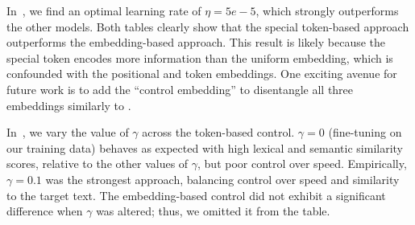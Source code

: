 In~, we find an optimal learning rate of $\eta = 5e-5$, which strongly outperforms the other models. Both tables clearly show that the special token-based approach outperforms the embedding-based approach. This result is likely because the special token encodes more information than the uniform embedding, which is confounded with the positional and token embeddings. One exciting avenue for future work is to add the ``control embedding'' to disentangle all three embeddings similarly to \citet{he2020deberta}. 

In~, we vary the value of $\gamma$ across the token-based control. $\gamma=0$ (\ie fine-tuning on our training data) behaves as expected with high lexical and semantic similarity scores, relative to the other values of $\gamma$, but poor control over speed. Empirically, $\gamma = 0.1$ was the strongest approach, balancing control over speed and similarity to the target text. The embedding-based control did not exhibit a significant difference when $\gamma$ was altered; thus, we omitted it from the table.

